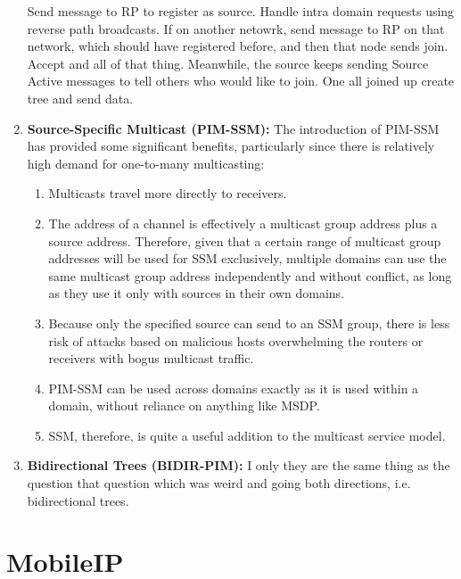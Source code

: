 \documentclass[12pt]{book}
\begin{document}
\begin{enumerate}
    Send message to RP to register as source. Handle intra domain requests using reverse path broadcasts. If on another netowrk, send message to RP on that network, which should have registered before, and then that node sends join. Accept and all of that thing. Meanwhile, the source keeps sending Source Active messages to tell others who would like to join. One all joined up create tree and send data.
    \item \textbf{Source-Specific Multicast (PIM-SSM):} 
    The introduction of PIM-SSM has provided some significant benefits, particularly since there is relatively high demand for one-to-many multicasting:
    \begin{enumerate}
    \item Multicasts travel more directly to receivers.
    \item The address of a channel is effectively a multicast group address plus a source address. Therefore, given that a certain range of multicast group addresses will be used for SSM exclusively, multiple domains can use the same multicast group address independently and without conflict, as long as they use it only with sources in their own domains.
    \item Because only the specified source can send to an SSM group, there is less risk of attacks based on malicious hosts overwhelming the routers or receivers with bogus multicast traffic.
    \item PIM-SSM can be used across domains exactly as it is used within a domain, without reliance on anything like MSDP.
    \item SSM, therefore, is quite a useful addition to the multicast service model.
    \end{enumerate}
    \item \textbf{Bidirectional Trees (BIDIR-PIM): } I only they are the same thing as the question that question which was weird and going both directions, i.e. bidirectional trees.
    
\end{enumerate}

\section{MobileIP}
\end{document}
